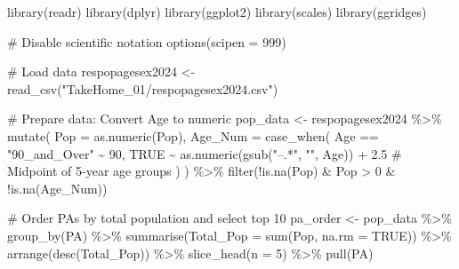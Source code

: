 \documentclass[
  letterpaper,
  DIV=11,
  numbers=noendperiod]{scrartcl}
\newenvironment{Shaded}{\begin{snugshade}}{\end{snugshade}}
\newcommand{\AttributeTok}[1]{\textcolor[rgb]{0.40,0.45,0.13}{#1}}
\newcommand{\CommentTok}[1]{\textcolor[rgb]{0.37,0.37,0.37}{#1}}
\newcommand{\ConstantTok}[1]{\textcolor[rgb]{0.56,0.35,0.01}{#1}}
\newcommand{\DecValTok}[1]{\textcolor[rgb]{0.68,0.00,0.00}{#1}}
\newcommand{\FloatTok}[1]{\textcolor[rgb]{0.68,0.00,0.00}{#1}}
\newcommand{\FunctionTok}[1]{\textcolor[rgb]{0.28,0.35,0.67}{#1}}
\newcommand{\NormalTok}[1]{\textcolor[rgb]{0.00,0.23,0.31}{#1}}
\newcommand{\OtherTok}[1]{\textcolor[rgb]{0.00,0.23,0.31}{#1}}
\newcommand{\SpecialCharTok}[1]{\textcolor[rgb]{0.37,0.37,0.37}{#1}}
\newcommand{\StringTok}[1]{\textcolor[rgb]{0.13,0.47,0.30}{#1}}
\begin{document}
\begin{Shaded}
\begin{Highlighting}[]
\FunctionTok{library}\NormalTok{(readr)}
\FunctionTok{library}\NormalTok{(dplyr)}
\FunctionTok{library}\NormalTok{(ggplot2)}
\FunctionTok{library}\NormalTok{(scales)}
\FunctionTok{library}\NormalTok{(ggridges)}

\CommentTok{\# Disable scientific notation}
\FunctionTok{options}\NormalTok{(}\AttributeTok{scipen =} \DecValTok{999}\NormalTok{)}

\CommentTok{\# Load data}
\NormalTok{respopagesex2024 }\OtherTok{\textless{}{-}} \FunctionTok{read\_csv}\NormalTok{(}\StringTok{"TakeHome\_01/respopagesex2024.csv"}\NormalTok{)}

\CommentTok{\# Prepare data: Convert Age to numeric}
\NormalTok{pop\_data }\OtherTok{\textless{}{-}}\NormalTok{ respopagesex2024 }\SpecialCharTok{\%\textgreater{}\%}
  \FunctionTok{mutate}\NormalTok{(}
    \AttributeTok{Pop =} \FunctionTok{as.numeric}\NormalTok{(Pop),}
    \AttributeTok{Age\_Num =} \FunctionTok{case\_when}\NormalTok{(}
\NormalTok{      Age }\SpecialCharTok{==} \StringTok{"90\_and\_Over"} \SpecialCharTok{\textasciitilde{}} \DecValTok{90}\NormalTok{,}
      \ConstantTok{TRUE} \SpecialCharTok{\textasciitilde{}} \FunctionTok{as.numeric}\NormalTok{(}\FunctionTok{gsub}\NormalTok{(}\StringTok{"–.*"}\NormalTok{, }\StringTok{""}\NormalTok{, Age)) }\SpecialCharTok{+} \FloatTok{2.5}  \CommentTok{\# Midpoint of 5{-}year age groups}
\NormalTok{    )}
\NormalTok{  ) }\SpecialCharTok{\%\textgreater{}\%}
  \FunctionTok{filter}\NormalTok{(}\SpecialCharTok{!}\FunctionTok{is.na}\NormalTok{(Pop) }\SpecialCharTok{\&}\NormalTok{ Pop }\SpecialCharTok{\textgreater{}} \DecValTok{0} \SpecialCharTok{\&} \SpecialCharTok{!}\FunctionTok{is.na}\NormalTok{(Age\_Num))}

\CommentTok{\# Order PAs by total population and select top 10}
\NormalTok{pa\_order }\OtherTok{\textless{}{-}}\NormalTok{ pop\_data }\SpecialCharTok{\%\textgreater{}\%}
  \FunctionTok{group\_by}\NormalTok{(PA) }\SpecialCharTok{\%\textgreater{}\%}
  \FunctionTok{summarise}\NormalTok{(}\AttributeTok{Total\_Pop =} \FunctionTok{sum}\NormalTok{(Pop, }\AttributeTok{na.rm =} \ConstantTok{TRUE}\NormalTok{)) }\SpecialCharTok{\%\textgreater{}\%}
  \FunctionTok{arrange}\NormalTok{(}\FunctionTok{desc}\NormalTok{(Total\_Pop)) }\SpecialCharTok{\%\textgreater{}\%}
  \FunctionTok{slice\_head}\NormalTok{(}\AttributeTok{n =} \DecValTok{5}\NormalTok{) }\SpecialCharTok{\%\textgreater{}\%}
  \FunctionTok{pull}\NormalTok{(PA)}


\end{Highlighting}
\end{Shaded}
\end{document}
